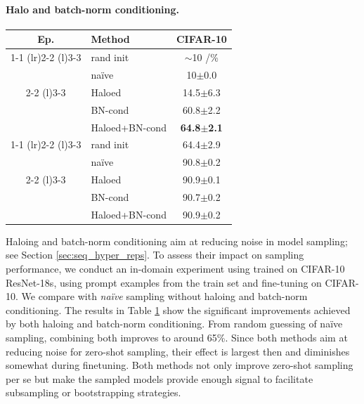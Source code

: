 \paragraph{Halo and batch-norm conditioning.}
\begin{table}
\vspace{-10mm}
\label{tab:ablation_halo_bn_cond}
\small
\setlength{\tabcolsep}{3pt}
\begin{tabularx}{1.0\linewidth}{clc}
\toprule
Ep.              & Method        & CIFAR-10           \\
\cmidrule(r){1-1} \cmidrule(lr){2-2} \cmidrule(l){3-3}
\multirow{5}{*}{0} & rand init     & $\sim$10 /\%       \\
                   & naïve         & 10$\pm$0.0            \\
\cmidrule(lr){2-2} \cmidrule(l){3-3}
                   
                   & Haloed        & 14.5$\pm$6.3          \\
                   & BN-cond       & 60.8$\pm$2.2          \\
                   & Haloed+BN-cond & \textbf{64.8$\pm$2.1} \\
\cmidrule(r){1-1} \cmidrule(lr){2-2} \cmidrule(l){3-3}
\multirow{5}{*}{5} & rand init     & 64.4$\pm$2.9          \\
                   & naïve         & 90.8$\pm$0.2          \\
\cmidrule(lr){2-2} \cmidrule(l){3-3}
                   & Haloed        & 90.9$\pm$0.1          \\
                   & BN-cond       & 90.7$\pm$0.2          \\
                   & Haloed+BN-cond & 90.9$\pm$0.2         
    \\ 
\bottomrule
\end{tabularx}
\vspace{-4mm}
\end{table} 
Haloing and batch-norm conditioning aim at reducing noise in model sampling; see Section \ref{sec:seq_hyper_reps}. 
To assess their impact on sampling performance, we conduct an in-domain experiment using \ourmethod trained on CIFAR-10 ResNet-18s, using prompt examples from the train set and fine-tuning on CIFAR-10. We compare with \emph{naïve} sampling without haloing and batch-norm conditioning.
The results in Table \ref{tab:ablation_halo_bn_cond} show the significant improvements achieved by both haloing and batch-norm conditioning. From random guessing of naïve sampling, combining both improves to around 65\%. Since both methods aim at reducing noise for zero-shot sampling, their effect is largest then and diminishes somewhat during finetuning. Both methods not only improve zero-shot sampling per se but make the sampled models provide enough signal to facilitate subsampling or bootstrapping strategies.

